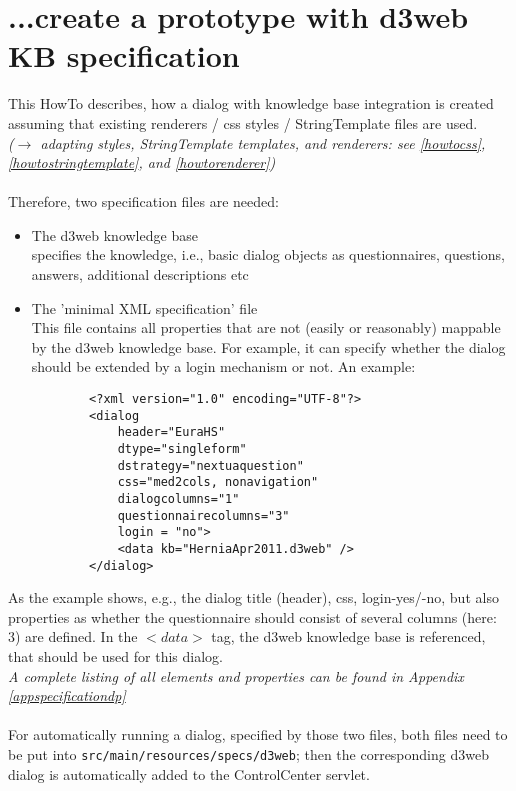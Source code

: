 \documentclass[a4paper,10pt]{scrreprt}
\begin{document}
\section{...create a prototype with d3web KB specification} \label{howtod3webprototyping}
This HowTo describes, how a dialog with knowledge base integration is created assuming that existing renderers / css styles / StringTemplate files are used.\\
\textit{($\rightarrow$ adapting styles, StringTemplate templates, and renderers: see \ref{howtocss}, \ref{howtostringtemplate}, and \ref{howtorenderer})} \\\\
Therefore, two specification files are needed:
\begin{itemize}
	\item The d3web knowledge base\\
	specifies the knowledge, i.e., basic dialog objects as questionnaires, questions, answers, additional descriptions etc 
	
	\item The 'minimal XML specification' file\\
	This file contains all properties that are not (easily or reasonably) mappable by the d3web knowledge base. For example, it can specify whether the dialog should be extended by a login mechanism or not. 
	An example:
	\begin{verbatim}
		<?xml version="1.0" encoding="UTF-8"?>
		<dialog 
		    header="EuraHS"  
		    dtype="singleform" 
		    dstrategy="nextuaquestion" 
		    css="med2cols, nonavigation" 
		    dialogcolumns="1"
		    questionnairecolumns="3"
		    login = "no">
		    <data kb="HerniaApr2011.d3web" />
		</dialog>
	\end{verbatim}
\end{itemize}
		
As the example shows, e.g., the dialog title (header), css, login-yes/-no, but also properties as whether the questionnaire should consist of several columns (here: 3) are defined. In the $<data>$ tag, the d3web knowledge base is referenced, that should be used for this dialog.\\
\textit{A complete listing of all elements and properties can be found in Appendix \ref{appspecificationdp}}	\\\\
%
\noindent For automatically running a dialog, specified by those two files, both files need to be put into \texttt{src/main/resources/specs/d3web}; then the corresponding d3web dialog is automatically added to the ControlCenter servlet.
\end{document}
